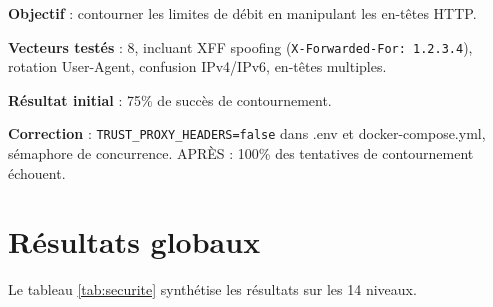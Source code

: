 \documentclass[12pt,a4paper,oneside]{report}
\begin{document}
\textbf{Objectif} : contourner les limites de d\'{e}bit en manipulant les en-t\^{e}tes HTTP.



\textbf{Vecteurs test\'{e}s} : 8, incluant XFF spoofing (\texttt{X-Forwarded-For: 1.2.3.4}), rotation User-Agent, confusion IPv4/IPv6, en-t\^{e}tes multiples.



\textbf{R\'{e}sultat initial} : 75\% de succ\`{e}s de contournement.



\textbf{Correction} : \texttt{TRUST\_PROXY\_HEADERS=false} dans .env et docker-compose.yml, s\'{e}maphore de concurrence. APR\`{E}S : 100\% des tentatives de contournement \'{e}chouent.



\section{R\'{e}sultats globaux}



Le tableau \ref{tab:securite} synth\'{e}tise les r\'{e}sultats sur les 14 niveaux.
\end{document}
